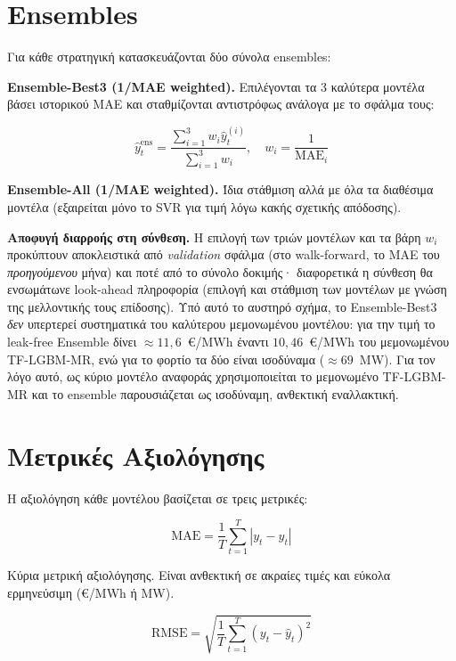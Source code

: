 \section{Ensembles}
\label{sec:ensembles}

Για κάθε στρατηγική κατασκευάζονται δύο σύνολα ensembles:

\textbf{Ensemble-Best3 (1/MAE weighted).} Επιλέγονται τα 3 καλύτερα μοντέλα βάσει
ιστορικού MAE και σταθμίζονται αντιστρόφως ανάλογα με το σφάλμα τους:

\begin{equation}
  \hat{y}^{\text{ens}}_t = \frac{\sum_{i=1}^{3} w_i \hat{y}^{(i)}_t}{\sum_{i=1}^{3} w_i},
  \quad w_i = \frac{1}{\mathrm{MAE}_i}
  \label{eq:ensemble}
\end{equation}

\textbf{Ensemble-All (1/MAE weighted).} Ίδια στάθμιση αλλά με όλα τα διαθέσιμα μοντέλα
(εξαιρείται μόνο το SVR για τιμή λόγω κακής σχετικής απόδοσης).

\textbf{Αποφυγή διαρροής στη σύνθεση.} Η επιλογή των τριών μοντέλων και τα βάρη
$w_i$ προκύπτουν αποκλειστικά από \emph{validation} σφάλμα (στο walk-forward,
το MAE του \emph{προηγούμενου} μήνα) και ποτέ από το σύνολο δοκιμής·
διαφορετικά η σύνθεση θα ενσωμάτωνε look-ahead πληροφορία (επιλογή και στάθμιση
των μοντέλων με γνώση της μελλοντικής τους επίδοσης). Υπό αυτό το αυστηρό σχήμα, το
Ensemble-Best3 \emph{δεν} υπερτερεί συστηματικά του καλύτερου μεμονωμένου μοντέλου:
για την τιμή το leak-free Ensemble δίνει $\approx 11{,}6$~€/MWh έναντι
$10{,}46$~€/MWh του μεμονωμένου TF-LGBM-MR, ενώ για το φορτίο τα δύο είναι
ισοδύναμα ($\approx 69$~MW). Για τον λόγο αυτό, ως κύριο μοντέλο αναφοράς
χρησιμοποιείται το μεμονωμένο TF-LGBM-MR και το ensemble παρουσιάζεται ως
ισοδύναμη, ανθεκτική εναλλακτική.


\section{Μετρικές Αξιολόγησης}
\label{sec:metrics}

Η αξιολόγηση κάθε μοντέλου βασίζεται σε τρεις μετρικές:

\begin{equation}
  \mathrm{MAE} = \frac{1}{T}\sum_{t=1}^{T} |y_t - \hat{y}_t|
  \label{eq:mae}
\end{equation}

Κύρια μετρική αξιολόγησης. Είναι ανθεκτική σε ακραίες τιμές και εύκολα ερμηνεύσιμη
(€/MWh ή MW).

\begin{equation}
  \mathrm{RMSE} = \sqrt{\frac{1}{T}\sum_{t=1}^{T} (y_t - \hat{y}_t)^2}
  \label{eq:rmse}
\end{equation}

